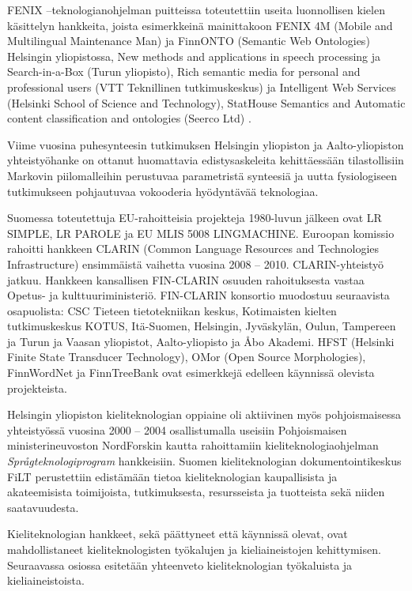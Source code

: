 \documentclass[]{../../metanetpaper}
\begin{document}
\begin{multicols}{2}
FENIX –teknologianohjelman puitteissa toteutettiin useita luonnollisen
kielen käsittelyn hankkeita, joista esimerkkeinä mainittakoon FENIX 4M
(Mobile and Multilingual Maintenance Man) ja FinnONTO (Semantic Web
Ontologies) Helsingin yliopistossa, New methods and applications in
speech processing ja Search-in-a-Box (Turun yliopisto), Rich semantic
media for personal and professional users (VTT Teknillinen
tutkimuskeskus) ja Intelligent Web Services (Helsinki School of
Science and Technology), StatHouse Semantics and Automatic content
classification and ontologies (Seerco Ltd) \cite{LoppuFENIX}.

Viime vuosina puhesynteesin tutkimuksen Helsingin yliopiston ja
Aalto-yliopiston yhteistyöhanke on ottanut huomattavia
edistysaskeleita kehittäessään tilastollisiin Markovin piilomalleihin
perustuvaa parametristä synteesiä ja uutta fysiologiseen tutkimukseen
pohjautuvaa vokooderia hyödyntävää teknologiaa.

Suomessa toteutettuja EU-rahoitteisia projekteja 1980-luvun jälkeen
ovat LR SIMPLE, LR PAROLE ja EU MLIS 5008 LINGMACHINE. Euroopan
komissio rahoitti hankkeen CLARIN (Common Language Resources and
Technologies Infrastructure) ensimmäistä vaihetta vuosina 2008 –
2010. CLARIN-yhteistyö jatkuu. Hankkeen kansallisen FIN-CLARIN osuuden
rahoituksesta vastaa Opetus- ja kulttuuriministeriö. FIN-CLARIN
konsortio muodostuu seuraavista osapuolista: CSC Tieteen
tietotekniikan keskus, Kotimaisten kielten tutkimuskeskus KOTUS,
Itä-Suomen, Helsingin, Jyväskylän, Oulun, Tampereen ja Turun ja Vaasan
yliopistot, Aalto-yliopisto ja Åbo Akademi. HFST (Helsinki Finite
State Transducer Technology), OMor (Open Source Morphologies),
FinnWordNet ja FinnTreeBank ovat esimerkkejä edelleen käynnissä
olevista projekteista.

Helsingin yliopiston kieliteknologian oppiaine oli aktiivinen myös
pohjoismaisessa yhteistyössä vuosina 2000 – 2004 osallistumalla
useisiin Pohjoismaisen ministerineuvoston NordForskin kautta
rahoittamiin kieliteknologiaohjelman \textit{Språgteknologiprogram}
hankkeisiin. Suomen kieliteknologian dokumentointikeskus FiLT
perustettiin edistämään tietoa kieliteknologian kaupallisista ja
akateemisista toimijoista, tutkimuksesta, resursseista ja tuotteista
sekä niiden saatavuudesta.

Kieliteknologian hankkeet, sekä päättyneet että käynnissä olevat, ovat
mahdollistaneet kieliteknologisten työkalujen ja kieliaineistojen
kehittymisen.  Seuraavassa osiossa esitetään yhteenveto
kieliteknologian työkaluista ja kieliaineistoista.



\end{multicols}
\end{document}
